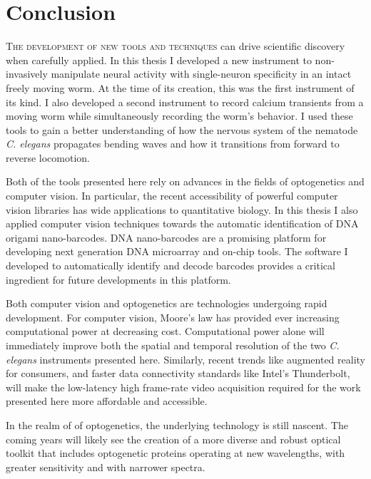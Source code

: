 
\chapter{Conclusion}
\lettrine{T}{he development of new tools and techniques} can drive scientific discovery when carefully applied. In this thesis I developed a new instrument to non-invasively manipulate neural activity with single-neuron specificity  in an intact freely moving worm. At the time of its creation, this was the first instrument of its kind. I also developed a second instrument to record calcium transients from a moving worm while simultaneously recording the worm's behavior. I used these tools to gain  a better understanding of how the nervous system of the nematode \textit{C. elegans} propagates bending waves and how it transitions from forward to reverse locomotion.

Both of the tools presented here  rely on advances in the fields of optogenetics and computer vision. In particular, the recent accessibility of powerful computer vision libraries  has wide applications to quantitative biology. In this thesis I also applied computer vision techniques towards the automatic identification of  DNA origami nano-barcodes. DNA nano-barcodes are a promising platform for developing next generation DNA microarray and on-chip tools.  The software I developed to automatically identify and decode barcodes provides a critical ingredient for future developments in this platform. 

Both  computer vision and optogenetics are technologies undergoing rapid development.
For computer vision, Moore's law has provided ever increasing computational power at decreasing cost. Computational power alone will immediately improve both the spatial and temporal resolution of the two \textit{C. elegans} instruments presented here. Similarly, recent trends like augmented reality for consumers, and faster data connectivity standards like Intel's Thunderbolt, will make the low-latency high frame-rate video acquisition  required for the work presented here more affordable and accessible.


In the realm of of optogenetics, the underlying technology is still nascent. The coming years will likely see the creation of a more diverse and robust optical toolkit that includes optogenetic proteins operating at new wavelengths, with greater sensitivity and with narrower spectra.  



